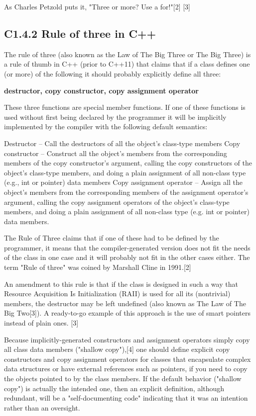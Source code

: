 \documentclass{book}
\begin{document}
As Charles Petzold puts it, "Three or more? Use a for!"[2] [3]
\subsection{C1.4.2 Rule of three in C++}\label{ROTC}
The rule of three (also known as the Law of The Big Three or The Big Three) is a rule of thumb in C++ (prior to C++11) that claims that if
a class defines one (or more) of the following it should probably explicitly define all three:

    \textbf{destructor,
    copy constructor,
    copy assignment operator}

These three functions are special member functions.
If one of these functions is used without first being declared by the programmer it will be implicitly implemented by the compiler with the following default semantics:

    Destructor – Call the destructors of all the object's class-type members
    Copy constructor – Construct all the object's members from the corresponding members of the copy constructor's argument, 
                    calling the copy constructors of the object's class-type members, and doing a plain assignment of all non-class type (e.g., int or pointer) data members
    Copy assignment operator – Assign all the object's members from the corresponding members of the assignment operator's argument, 
                    calling the copy assignment operators of the object's class-type members, and doing a plain assignment of all non-class type (e.g. int or pointer) data members.

The Rule of Three claims that if one of these had to be defined by the programmer,
it means that the compiler-generated version does not fit the needs of the class in one case and it will probably not fit in the other cases either.
The term "Rule of three" was coined by Marshall Cline in 1991.[2]

An amendment to this rule is that if the class is designed in such a way that Resource Acquisition Is Initialization (RAII) is used for all its (nontrivial) members,
the destructor may be left undefined (also known as The Law of The Big Two[3]). A ready-to-go example of this approach is the use of smart pointers instead of plain ones. [3]

Because implicitly-generated constructors and assignment operators simply copy all class data members ("shallow copy"),[4]
one should define explicit copy constructors and copy assignment operators for classes that encapsulate complex data structures or have external references such as pointers,
if you need to copy the objects pointed to by the class members. If the default behavior ("shallow copy") is actually the intended one,
then an explicit definition, although redundant, will be a "self-documenting code" indicating that it was an intention rather than an oversight.
\end{document}
